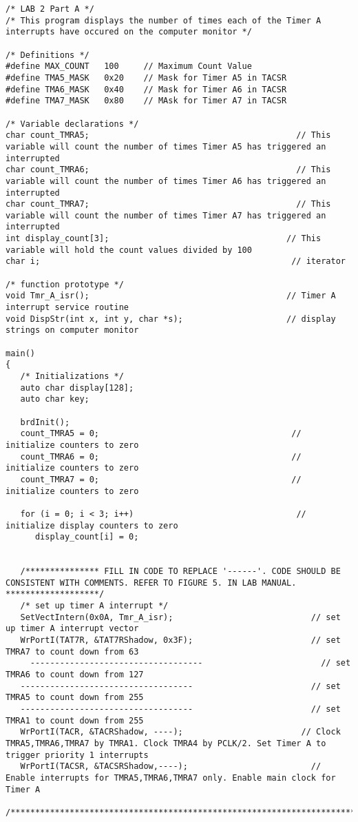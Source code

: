 \begin{lstlisting}[frame=single]  % Start your code-block
/* LAB 2 Part A */
/* This program displays the number of times each of the Timer A interrupts have occured on the computer monitor */

/* Definitions */
#define MAX_COUNT   100     // Maximum Count Value
#define TMA5_MASK   0x20    // Mask for Timer A5 in TACSR
#define TMA6_MASK   0x40    // Mask for Timer A6 in TACSR
#define TMA7_MASK   0x80    // MAsk for Timer A7 in TACSR

/* Variable declarations */
char count_TMRA5;                                          // This variable will count the number of times Timer A5 has triggered an interrupted
char count_TMRA6;                                          // This variable will count the number of times Timer A6 has triggered an interrupted
char count_TMRA7;                                          // This variable will count the number of times Timer A7 has triggered an interrupted
int display_count[3];                                    // This variable will hold the count values divided by 100
char i;                                                   // iterator

/* function prototype */
void Tmr_A_isr();                                        // Timer A interrupt service routine
void DispStr(int x, int y, char *s);                     // display strings on computer monitor

main()
{
   /* Initializations */
   auto char display[128];
   auto char key;

   brdInit();
   count_TMRA5 = 0;                                       // initialize counters to zero
   count_TMRA6 = 0;                                       // initialize counters to zero
   count_TMRA7 = 0;                                       // initialize counters to zero

   for (i = 0; i < 3; i++)                                 // initialize display counters to zero
      display_count[i] = 0;


   /*************** FILL IN CODE TO REPLACE '------'. CODE SHOULD BE CONSISTENT WITH COMMENTS. REFER TO FIGURE 5. IN LAB MANUAL. *******************/
   /* set up timer A interrupt */
   SetVectIntern(0x0A, Tmr_A_isr);                            // set up timer A interrupt vector
   WrPortI(TAT7R, &TAT7RShadow, 0x3F);                        // set TMRA7 to count down from 63
     -----------------------------------                        // set TMRA6 to count down from 127
   -----------------------------------                        // set TMRA5 to count down from 255
   -----------------------------------                        // set TMRA1 to count down from 255
   WrPortI(TACR, &TACRShadow, ----);                        // Clock TMRA5,TMRA6,TMRA7 by TMRA1. Clock TMRA4 by PCLK/2. Set Timer A to trigger priority 1 interrupts
   WrPortI(TACSR, &TACSRShadow,----);                         // Enable interrupts for TMRA5,TMRA6,TMRA7 only. Enable main clock for Timer A
   /************************************************************************************************************************************************/



\end{lstlisting}
